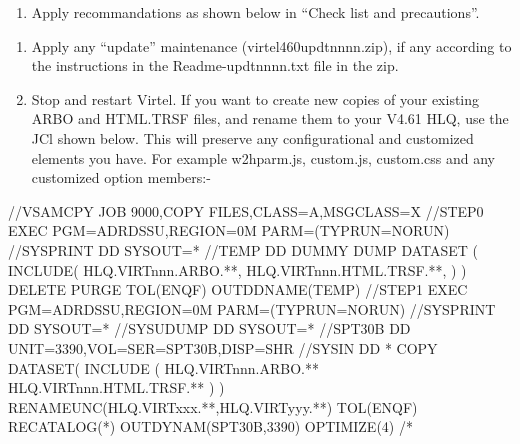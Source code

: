 \documentclass[letterpaper,10pt,english]{sphinxmanual}
\begin{document}
\begin{enumerate}
\def\theenumi{\arabic{enumi}}
\def\labelenumi{\theenumi .}
\makeatletter\def\p@enumii{\p@enumi \theenumi .}\makeatother
\setcounter{enumi}{10}
\item {} 
Apply recommandations as shown below in “Check list and precautions”.

\end{enumerate}

\newpage
\begin{enumerate}
\def\theenumi{\arabic{enumi}}
\def\labelenumi{\theenumi .}
\makeatletter\def\p@enumii{\p@enumi \theenumi .}\makeatother
\setcounter{enumi}{11}
\item {} 
Apply any “update” maintenance (virtel460updtnnnn.zip), if any according to the instructions in the Readme-updtnnnn.txt file in the zip.

\item {} 
Stop and restart Virtel. If you want to create new copies of your existing ARBO and HTML.TRSF files, and rename them to your V4.61 HLQ, use the JCl shown below. This will preserve any configurational and customized elements you have. For example w2hparm.js, custom.js, custom.css and any customized option members:-

\end{enumerate}

\begin{sphinxVerbatim}[commandchars=\\\{\}]
//\PYGZdl{}VSAMCPY JOB 9000,\PYGZsq{}COPY FILES\PYGZsq{},CLASS=A,MSGCLASS=X
//STEP0   EXEC PGM=ADRDSSU,REGION=0M PARM=(\PYGZsq{}TYPRUN=NORUN\PYGZsq{})
//SYSPRINT DD SYSOUT=*
//TEMP DD DUMMY
 DUMP DATASET              \PYGZhy{}
      (                    \PYGZhy{}
       INCLUDE(            \PYGZhy{}
      HLQ.VIRTnnn.ARBO.**, \PYGZhy{}
      HLQ.VIRTnnn.HTML.TRSF.**, \PYGZhy{}
                )         \PYGZhy{}
      )                   \PYGZhy{}
      DELETE    \PYGZhy{}
      PURGE      \PYGZhy{}
      TOL(ENQF) \PYGZhy{}
      OUTDDNAME(TEMP)
//STEP1   EXEC PGM=ADRDSSU,REGION=0M PARM=(\PYGZsq{}TYPRUN=NORUN\PYGZsq{})
//SYSPRINT DD  SYSOUT=*
//SYSUDUMP DD  SYSOUT=*
//SPT30B   DD  UNIT=3390,VOL=SER=SPT30B,DISP=SHR
//SYSIN    DD  *
 COPY                                             \PYGZhy{}
       DATASET(                                   \PYGZhy{}
       INCLUDE (                                  \PYGZhy{}
       HLQ.VIRTnnn.ARBO.**                    \PYGZhy{}
       HLQ.VIRTnnn.HTML.TRSF.**               \PYGZhy{}
  )                                               \PYGZhy{}
  )\PYGZhy{}
  RENAMEUNC(HLQ.VIRTxxx.**,HLQ.VIRTyyy.**) \PYGZhy{}
  TOL(ENQF)   \PYGZhy{}
  RECATALOG(*) \PYGZhy{}
  OUTDYNAM(SPT30B,3390) \PYGZhy{}
  OPTIMIZE(4)
/*
\end{sphinxVerbatim}
\end{document}
